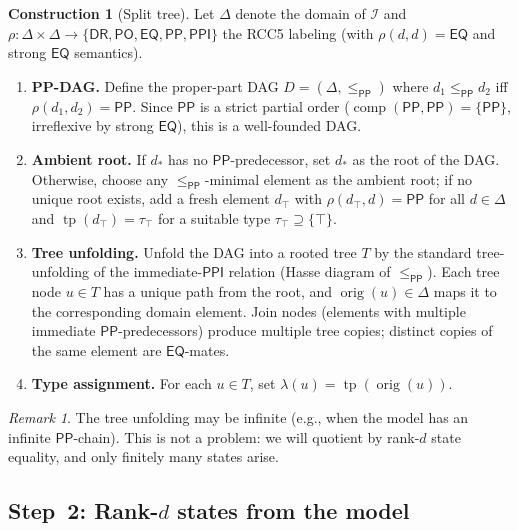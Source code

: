 \documentclass[11pt]{article}
\theoremstyle{definition}
\newtheorem{construction}[theorem]{Construction}
\theoremstyle{remark}
\newtheorem{remark}[theorem]{Remark}
\newcommand{\DR}{\mathsf{DR}}
\newcommand{\PO}{\mathsf{PO}}
\newcommand{\PP}{\mathsf{PP}}
\newcommand{\PPI}{\mathsf{PPI}}
\newcommand{\EQ}{\mathsf{EQ}}
\newcommand{\tp}{\operatorname{tp}}
\newcommand{\comp}{\operatorname{comp}}
\newcommand{\orig}{\operatorname{orig}}
\begin{document}
\begin{construction}[Split tree]\label{con:split-tree}
Let $\Delta$ denote the domain of $\mathcal{I}$ and
$\rho:\Delta\times\Delta\to\{\DR,\PO,\EQ,\PP,\PPI\}$ the RCC5
labeling (with $\rho(d,d)=\EQ$ and strong $\EQ$ semantics).

\begin{enumerate}
\item \textbf{PP-DAG.}\; Define the proper-part DAG
  $D=(\Delta,\le_{\PP})$ where $d_1\le_{\PP} d_2$ iff
  $\rho(d_1,d_2)=\PP$.  Since $\PP$ is a strict partial order
  ($\comp(\PP,\PP)=\{\PP\}$, irreflexive by strong $\EQ$), this is
  a well-founded DAG.

\item \textbf{Ambient root.}\;
  If $d_\ast$ has no $\PP$-predecessor, set $d_\ast$ as the root of
  the DAG.  Otherwise, choose any $\le_{\PP}$-minimal element as the
  ambient root; if no unique root exists, add a fresh element $d_\top$
  with $\rho(d_\top,d)=\PP$ for all $d\in\Delta$ and
  $\tp(d_\top)=\tau_\top$ for a suitable type
  $\tau_\top\supseteq\{\top\}$.

\item \textbf{Tree unfolding.}\;
  Unfold the DAG into a rooted tree $T$ by the standard tree-unfolding
  of the immediate-$\PPI$ relation (Hasse diagram of $\le_{\PP}$).
  Each tree node $u\in T$ has a unique path from the root, and
  $\orig(u)\in\Delta$ maps it to the corresponding domain element.
  Join nodes (elements with multiple immediate $\PP$-predecessors)
  produce multiple tree copies; distinct copies of the same element
  are $\EQ$-mates.

\item \textbf{Type assignment.}\; For each $u\in T$, set
  $\lambda(u)=\tp(\orig(u))$.
\end{enumerate}
\end{construction}

\begin{remark}
The tree unfolding may be infinite (e.g., when the model has an
infinite $\PP$-chain).  This is not a problem: we will quotient by
rank-$d$ state equality, and only finitely many states arise.
\end{remark}

\subsection{Step~2: Rank-$d$ states from the model}
\end{document}
